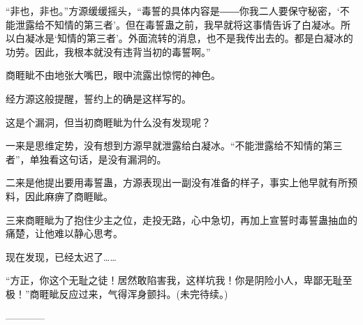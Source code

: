 \begin{this_body}
“非也，非也。”方源缓缓摇头，“毒誓的具体内容是――你我二人要保守秘密，‘不能泄露给不知情的第三者’。但在毒誓蛊之前，我早就将这事情告诉了白凝冰。所以白凝冰是‘知情的第三者’。外面流转的消息，也不是我传出去的。都是白凝冰的功劳。因此，我根本就没有违背当初的毒誓啊。”

商睚眦不由地张大嘴巴，眼中流露出惊愕的神色。

经方源这般提醒，誓约上的确是这样写的。

这是个漏洞，但当初商睚眦为什么没有发现呢？

一来是思维定势，没有想到方源早就泄露给白凝冰。“不能泄露给不知情的第三者”，单独看这句话，是没有漏洞的。

二来是他提出要用毒誓蛊，方源表现出一副没有准备的样子，事实上他早就有所预料，因此麻痹了商睚眦。

三来商睚眦为了抱住少主之位，走投无路，心中急切，再加上宣誓时毒誓蛊抽血的痛楚，让他难以静心思考。

现在发现，已经太迟了……

“方正，你这个无耻之徒！居然敢陷害我，这样坑我！你是阴险小人，卑鄙无耻至极！”商睚眦反应过来，气得浑身颤抖。(未完待续。)

------------

\end{this_body}

